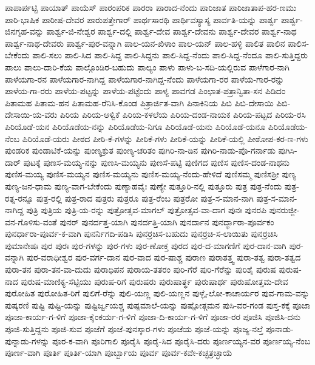 {ಪಾಪಾರ್ಪಟ್ಟಿ
ಪಾಯಾತ್
ಪಾಯೆಸ್
ಪಾರಂಪರಿಕ
ಪಾರರಾ
ಪಾರಾದ-ನೆಂದು
ಪಾರಿಜಾತ
ಪಾರಿಜಾತಾಪ-ಹರ-ಣಮು
ಪಾರಿ-ಭಾಷಿಕ
ಪಾರೀಷ-ದೇವರ
ಪಾರುಪತ್ತೇಗಾರ್
ಪಾರ್ಥಸಾರಥಿ
ಪಾರ್ಥಿವಸ್ಯಾಸ್ಯ
ಪಾರ್ವತಿ-ಯನ್ನು
ಪಾರ್ಶ್ವ
ಪಾರ್ಶ್ವ-ಜಿನಗೃಹ-ವನ್ನು
ಪಾರ್ಶ್ವ-ಜಿ-ನೇಶ್ವರ
ಪಾರ್ಶ್ವ-ದಲ್ಲಿ
ಪಾರ್ಶ್ವ-ದೇವ
ಪಾರ್ಶ್ವ-ದೇವನು
ಪಾರ್ಶ್ವ-ದೇವರ
ಪಾರ್ಶ್ವ-ನಾಥ
ಪಾರ್ಶ್ವ-ನಾಥ-ದೇವರು
ಪಾರ್ಶ್ವ-ಪುರ-ವನ್ನಾಗಿ
ಪಾಲ-ಯನ-ಖಿಳಾಂ
ಪಾಲ-ಯನ್
ಪಾಲ-ಹಳ್ಳಿ
ಪಾಲಿತ
ಪಾಲಿನ
ಪಾಲಿಸ-ಬೇಕೆಂದು
ಪಾಲಿ-ಸಲು
ಪಾಲಿ-ಸಿದ
ಪಾಲಿ-ಸಿದ್ದ
ಪಾಲಿ-ಸಿದ್ದನು
ಪಾಲಿ-ಸಿದ್ದ-ನೆಂದು
ಪಾಲಿ-ಸಿದ್ದ-ನೆಂದೂ
ಪಾಲಿ-ಸುತ್ತಿದ್ದರು
ಪಾಲು
ಪಾಲು-ದಾರಿ-ಕೆಯ
ಪಾಲ್ಗೊಂಡಿರ-ಬಹುದು
ಪಾಲ್ಯಂ
ಪಾಳು
ಪಾಳು-ಬ-ಸದಿ-ಯಲ್ಲಿರುವ
ಪಾಳೆಗಾರ-ನಾಗಿ
ಪಾಳೆಯಗಾ-ರನ
ಪಾಳೆಯಗಾರ-ನಾಗಿದ್ದ
ಪಾಳೆಯಗಾರ-ನಾಗಿದ್ದ-ನೆಂದು
ಪಾಳೆಯಗಾ-ರರ
ಪಾಳೆಯ-ಗಾರ-ರನ್ನು
ಪಾಳೆಯ-ಗಾ-ರರು
ಪಾಳೆಯ-ಪಟ್ಟನ್ನು
ಪಾಳೆಯ-ಪಟ್ಟೆಂದು
ಪಾಳ್ಯ
ಪಾವಗಡ
ಪಿಂಛಾತ-ಪತ್ರಾನ್ವಿತಾ-ಸನ
ಪಿಡಿದಂ
ಪಿತಾಮಹ
ಪಿತಾಮ-ಹನ
ಪಿತಾಮಹ-ರೆನಿಸಿ-ಕೊಂಡ
ಪಿತ್ರಾರ್ಜಿತ-ವಾಗಿ
ಪಿನಾಕಿನಿಯ
ಪಿಬಿ
ಪಿಬಿ-ದೇಸಾಯಿ
ಪಿಬಿ-ದೇಸಾಯಿ-ಯ-ವರು
ಪಿರಿಯ
ಪಿರಿಯ-ಆಳ್ವಿಕೆ
ಪಿರಿಯ-ಕಳಲೆಯ
ಪಿರಿಯ-ದಂಡ-ನಾಯಕ
ಪಿರಿಯ-ಪಟ್ಟದ
ಪಿರಿಯ-ರಸಿ
ಪಿರಿಯೊಡೆ-ಯನ
ಪಿರಿಯೊಡೆಯ-ನನ್ನು
ಪಿರಿಯೊಡೆಯ-ನಿಗೂ
ಪಿರಿಯೊಡೆ-ಯನು
ಪಿರಿಯೊಡೆ-ಯನೂ
ಪಿರಿಯೊಡೆಯ-ನೆಂಬ
ಪಿರಿಯೊಡೆ-ಯರು
ಪೀಠದ
ಪೀಠಿ-ಕೆ-ಗಳನ್ನು
ಪೀಠಿಕೆ-ಗಳು
ಪೀಠಿಕೆ-ಯನ್ನು
ಪೀಠಿಕೆ-ಯಲ್ಲಿ
ಪೀಠೋಪ-ಕರ-ಣ-ಗಳು
ಪುಂಡರಿಕ
ಪುಂಡಾಟಿಕೆ-ಯನ್ನು
ಪುಂಣ್ಯಕ್ರುತ
ಪುಂಣ್ಯ-ಚರಿತಂ
ಪುಗಿರಿ-ನಾ-ಡಿನ
ಪುಗಿರಿ-ನಾಡು-ಪೊ-ಗರ್ನಾಡು
ಪುಗಿಸಿ-ದಾರ್
ಪುಟಕ್ಕೆ
ಪುಣಸ-ಮಯ್ಯ-ನನ್ನು
ಪುಣಸಿ-ಮಯ್ಯನು
ಪುಣಸೆ-ಪಟ್ಟಿ
ಪುಣಿಗದ
ಪುಣಿಸ
ಪುಣಿಸ-ದಂಡ-ನಾಥನು
ಪುಣಿಸ-ಮಯ್ಯ
ಪುಣಿಸ-ಮಯ್ಯನ
ಪುಣಿಸ-ಮಯ್ಯನು
ಪುಣಿಸ-ಮಯ್ಯ-ನೆಂದು-ಹೇಳಿದೆ
ಪುಣಿಸಮ್ಮ
ಪುಣಿಸಶ್ರೀ
ಪುಣ್ಯ
ಪುಣ್ಯ-ಜನ-ಧಾಮ
ಪುಣ್ಯ-ವಾಗ-ಬೇಕೆಂದು
ಪುಣ್ಯಾಹವೈಃ
ಪುಣ್ಯೇ
ಪುತ್ತೂರಿ-ನಲ್ಲಿ
ಪುತ್ತೂರು
ಪುತ್ರ
ಪುತ್ರ-ನೆಂದು
ಪುತ್ರ-ರತ್ನ-ರನ್ನೂ
ಪುತ್ರ-ರಲ್ಲಿ
ಪುತ್ರ-ರಾದ
ಪುತ್ರರು
ಪುತ್ರರೂ
ಪುತ್ರ-ರೆಂಬ
ಪುತ್ರರೋ
ಪುತ್ರ-ಸ-ಮಾನ-ನಾಗಿ
ಪುತ್ರ-ಸ-ಮಾನ-ನಾಗಿದ್ದ
ಪುತ್ರಿ
ಪುತ್ರಿಯ
ಪುತ್ರಿ-ಯ-ರನ್ನು
ಪುತ್ರೋತ್ಸವ-ಮಾಗಲ್
ಪುತ್ರೋತ್ಸವ-ವಾ-ದಾಗ
ಪುನಃ
ಪುನರಪಿ
ಪುನರುಜ್ಜೀ-ವನ-ಗೊಳಿಸು-ವಂತೆ
ಪುನರ್
ಪುನರ್ದತ್ತ-ಯಾಗಿ
ಪುನರ್ದತ್ತಿ-ಯಾಗಿ
ಪುನರ್ದಾನ
ಪುನರ್ದ್ಧಾರಾ-ಪೂರ್ವಕಂ
ಪುನರ್ಧಾರಾ-ಪೂರ್ವ-ಕ-ವಾಗಿ
ಪುನರ್ನಿಗದಿ-ಪಡಿಸಿ
ಪುನರ್ರಚಿಸ-ಬಹುದು
ಪುನರ್ರಚಿ-ಸ-ಲಾಯಿತು
ಪುನರ್ರಚಿಸಿ
ಪುಮಾನೇಷಃ
ಪುರ
ಪುರಃ
ಪುರ-ಗಳನ್ನು
ಪುರ-ಗಳು
ಪುರ-ಣೋಕ್ತ
ಪುರದ
ಪುರ-ದ-ಮಾಗಣಿಗೆ
ಪುರ-ದಾನ-ವಾಗಿ
ಪುರ-ವನ್ನಾಗಿ
ಪುರ-ವರಾಧೀಶ್ವರ
ಪುರ-ವರ್ಗ-ದಾನ
ಪುರ-ವಾದ
ಪುರ-ಷಾಶ್ಚ
ಪುರಾಣ
ಪುರಾತತ್ತ್ವ
ಪುರಾ-ತತ್ವ
ಪುರಾ-ತತ್ವದ
ಪುರಾ-ತನ
ಪುರಾ-ತನ-ವಾ-ದುದು
ಪುರಾಧಿಪನ
ಪುರಾಯ-ತತರಂ
ಪುರಿ-ಗೆರೆ
ಪುರಿ-ಗೆರೆನ್ನು
ಪುರಿಶೈ
ಪುರುಷ
ಪುರುಷ-ನಾದ
ಪುರುಷ-ಮಾಣಿಕ್ಯ-ಸೆಟ್ಟಿಯು
ಪುರುಷ-ರಿಗೆ
ಪುರುಷರು
ಪುರುಷಾರ್ತ್ಥ
ಪುರುಷಾರ್ಥ
ಪುರುಷೋತ್ತಮ-ದೇವ
ಪುರೋಹಿತ
ಪುರೋಹಿತ-ರಿಗೆ
ಪುಲಿಗೆ-ರೆನ್ನು
ಪುಲಿ-ಯಣ್ಣ
ಪುಲಿ-ಯಣ್ಣನ
ಪುಳ್ಳೈ-ಲೋ-ಕಾಚಾರ್ಯರ
ಪುವ-ಗಾಮ-ವನ್ನು
ಪುಷ್ಕರಣಿ
ಪುಷ್ಟಿ
ಪುಷ್ಟಿ-ಯನ್ನು
ಪುಷ್ಟಿರ್ಜ್ವಯಶ್ಚ
ಪುಷ್ಪಮಾಲೆ-ಯನ್ನು
ಪುಷ್ಪೋತ್ಗಮನ
ಪುಸಿ-ವರ-ಗಂಡ
ಪುಸ್ತ-ಕಕ್ಕೆ
ಪೂಜಾ
ಪೂಜಾ-ಕಾರ್ಯ-ಗ-ಳಿಗೆ
ಪೂಜಾ-ಕೈಂಕರ್ಯ-ಗ-ಳಿಗೆ
ಪೂಜಾ-ದಿ-ಕಾರ್ಯ-ಗ-ಳಿಗೆ
ಪೂಜಾ-ರರ
ಪೂಜಿಸಿ
ಪೂಜಿಸಿ-ದನು
ಪೂಜಿ-ಸುತ್ತಿದ್ದನು
ಪೂಜಿ-ಸುವ
ಪೂಜೆಗೆ
ಪೂಜೆ-ಪುನಸ್ಕಾರ-ಗಳು
ಪೂಜೆಯ
ಪೂಜೆ-ಯನ್ನು
ಪೂಜ್ಯ-ನಲ್ತೆ
ಪೂನಾಡು-ಪುನ್ನಾಡು-ಗಳನ್ನು
ಪೂರ-ಕ-ವಾಗಿ
ಪೂರಿಗಾಲಿ
ಪೂರೈಸಿ
ಪೂರೈ-ಸಿದ
ಪೂರೈಸಿ-ದರು
ಪೂರ್ಣಯ್ಯನ-ವರ
ಪೂರ್ಣಯ್ಯ-ನೆಂಬ
ಪೂರ್ಣ-ವಾಗಿ
ಪೂರ್ತಿ
ಪೂರ್ತಿ-ಯಾಗಿ
ಪೂರ್ಬ್ಬಾಯ
ಪೂರ್ವ
ಪೂರ್ವ-ಕವೇ-ಕಚ್ಛತ್ರಚ್ಛಾಯೆ
}
